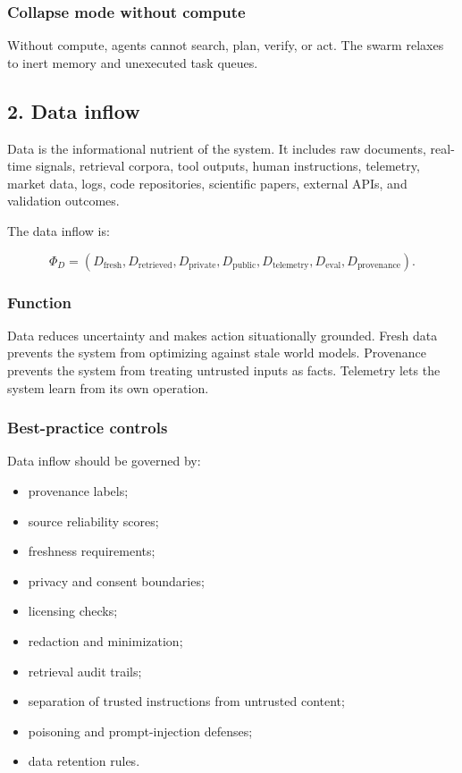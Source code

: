 \documentclass[
  11pt,
]{article}
\providecommand{\tightlist}{%
  \setlength{\itemsep}{0pt}\setlength{\parskip}{0pt}}
\begin{document}
\subsubsection{Collapse mode without
compute}\label{collapse-mode-without-compute}

Without compute, agents cannot search, plan, verify, or act. The swarm
relaxes to inert memory and unexecuted task queues.

\subsection{2. Data inflow}\label{data-inflow}

Data is the informational nutrient of the system. It includes raw
documents, real-time signals, retrieval corpora, tool outputs, human
instructions, telemetry, market data, logs, code repositories,
scientific papers, external APIs, and validation outcomes.

The data inflow is:

\[
\Phi_D=(D_{\text{fresh}},D_{\text{retrieved}},D_{\text{private}},D_{\text{public}},D_{\text{telemetry}},D_{\text{eval}},D_{\text{provenance}}).
\]

\subsubsection{Function}\label{function-1}

Data reduces uncertainty and makes action situationally grounded. Fresh
data prevents the system from optimizing against stale world models.
Provenance prevents the system from treating untrusted inputs as facts.
Telemetry lets the system learn from its own operation.

\subsubsection{Best-practice controls}\label{best-practice-controls-1}

Data inflow should be governed by:

\begin{itemize}
\tightlist
\item
  provenance labels;
\item
  source reliability scores;
\item
  freshness requirements;
\item
  privacy and consent boundaries;
\item
  licensing checks;
\item
  redaction and minimization;
\item
  retrieval audit trails;
\item
  separation of trusted instructions from untrusted content;
\item
  poisoning and prompt-injection defenses;
\item
  data retention rules.
\end{itemize}
\end{document}
